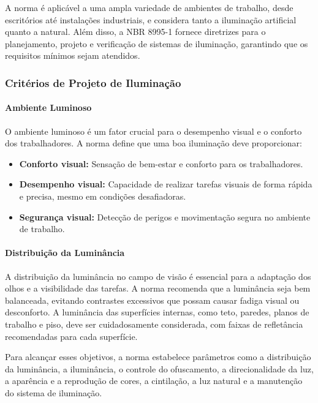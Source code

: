 A norma é aplicável a uma ampla variedade de ambientes de trabalho, desde escritórios até instalações industriais, e considera tanto a iluminação artificial quanto a natural. Além disso, a \gls{NBR} 8995-1 fornece diretrizes para o planejamento, projeto e verificação de sistemas de iluminação, garantindo que os requisitos mínimos sejam atendidos.

\subsubsection{Critérios de Projeto de Iluminação}
\paragraph{Ambiente Luminoso}

O ambiente luminoso é um fator crucial para o desempenho visual e o conforto dos trabalhadores. A norma define que uma boa iluminação deve proporcionar:

\begin{itemize}
    \item \textbf{Conforto visual:} Sensação de bem-estar e conforto para os trabalhadores.
    \item \textbf{Desempenho visual:} Capacidade de realizar tarefas visuais de forma rápida e precisa, mesmo em condições desafiadoras.
    \item \textbf{Segurança visual:} Detecção de perigos e movimentação segura no ambiente de trabalho.
\end{itemize}

\paragraph{Distribuição da Luminância}

A distribuição da luminância no campo de visão é essencial para a adaptação dos olhos e a visibilidade das tarefas. A norma recomenda que a luminância seja bem balanceada, evitando contrastes excessivos que possam causar fadiga visual ou desconforto. A luminância das superfícies internas, como teto, paredes, planos de trabalho e piso, deve ser cuidadosamente considerada, com faixas de refletância recomendadas para cada superfície.


Para alcançar esses objetivos, a norma estabelece parâmetros como a distribuição da luminância, a iluminância, o controle do ofuscamento, a direcionalidade da luz, a aparência e a reprodução de cores, a cintilação, a luz natural e a manutenção do sistema de iluminação.


